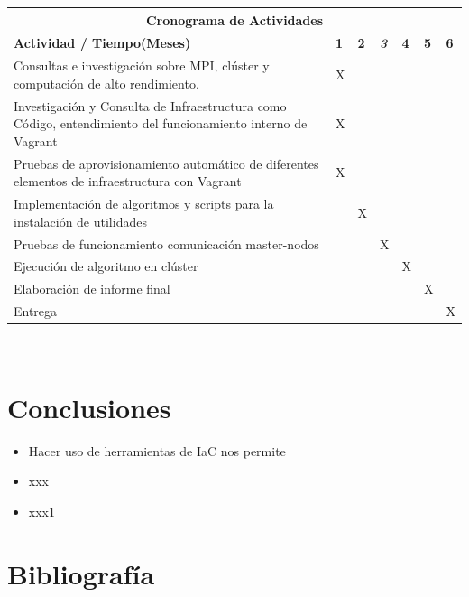 \documentclass[letterpaper, 12pt, oneside]{article}
\begin{document}
    \begin{center}
    \begin{tabular}{|p{9.5cm}|p{0.4cm}|p{0.4cm}|p{0.4cm}|p{0.4cm}|p{0.4cm}|p{0.4cm}|}
    \hline
    \multicolumn{7}{|c|}{\textbf{Cronograma de Actividades}}\\
    \hline
    \textbf{Actividad / Tiempo(Meses)} & \textbf{1} & \textbf{2} & \textit{\textbf{3}} & \textbf{4} & \textbf{5} & \textbf{6} \\
    \hline
    Consultas e investigación sobre MPI, clúster y computación de alto rendimiento. & X &   &   &   &   &   \\
    \hline
    Investigación y Consulta de Infraestructura como Código, entendimiento del funcionamiento interno de Vagrant & X &   &   &   &   &   \\
    \hline
    Pruebas de aprovisionamiento automático de diferentes elementos de infraestructura con Vagrant & X &   &   &   &   &   \\
    \hline
    Implementación de algoritmos y scripts para la instalación de utilidades &  & X  &   &   &   &   \\
    \hline
    Pruebas de funcionamiento comunicación master-nodos &   &   & X &   &   &   \\
    \hline
    Ejecución de algoritmo en clúster &   &   &   & X &   &   \\
    \hline
    Elaboración de informe final &   &   &   &   & X &   \\
    \hline
    Entrega &   &   &   &   &   & X \\
    \hline
    \end{tabular}
    \end{center} \\
    
    \clearpage
    
    \section{Conclusiones}
    
      \begin{itemize}
        \item Hacer uso de herramientas de IaC nos permite 
        \item xxx
        \item xxx1
        
    \end{itemize}
    \clearpage
    
    \section{Bibliografía}
    
    
    \nocite{*}
    
\end{document}
